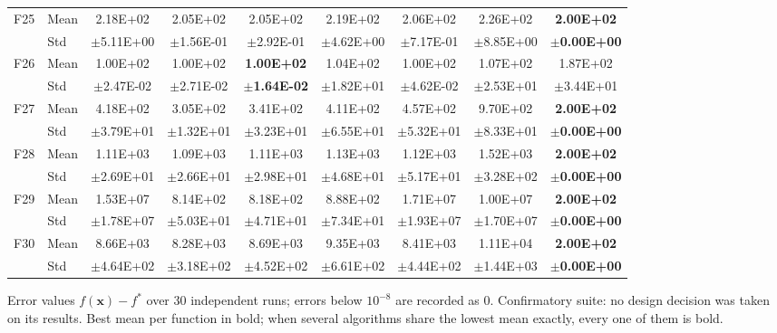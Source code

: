 \begin{table}[htbp]
{\begin{tabular}{clccccccc}
F25 & Mean & 2.18E+02 & 2.05E+02 & 2.05E+02 & 2.19E+02 & 2.06E+02 & 2.26E+02 & \textbf{2.00E+02} \\
 & Std & $\pm$5.11E+00 & $\pm$1.56E-01 & $\pm$2.92E-01 & $\pm$4.62E+00 & $\pm$7.17E-01 & $\pm$8.85E+00 & $\pm$\textbf{0.00E+00} \\
F26 & Mean & 1.00E+02 & 1.00E+02 & \textbf{1.00E+02} & 1.04E+02 & 1.00E+02 & 1.07E+02 & 1.87E+02 \\
 & Std & $\pm$2.47E-02 & $\pm$2.71E-02 & $\pm$\textbf{1.64E-02} & $\pm$1.82E+01 & $\pm$4.62E-02 & $\pm$2.53E+01 & $\pm$3.44E+01 \\
F27 & Mean & 4.18E+02 & 3.05E+02 & 3.41E+02 & 4.11E+02 & 4.57E+02 & 9.70E+02 & \textbf{2.00E+02} \\
 & Std & $\pm$3.79E+01 & $\pm$1.32E+01 & $\pm$3.23E+01 & $\pm$6.55E+01 & $\pm$5.32E+01 & $\pm$8.33E+01 & $\pm$\textbf{0.00E+00} \\
F28 & Mean & 1.11E+03 & 1.09E+03 & 1.11E+03 & 1.13E+03 & 1.12E+03 & 1.52E+03 & \textbf{2.00E+02} \\
 & Std & $\pm$2.69E+01 & $\pm$2.66E+01 & $\pm$2.98E+01 & $\pm$4.68E+01 & $\pm$5.17E+01 & $\pm$3.28E+02 & $\pm$\textbf{0.00E+00} \\
F29 & Mean & 1.53E+07 & 8.14E+02 & 8.18E+02 & 8.88E+02 & 1.71E+07 & 1.00E+07 & \textbf{2.00E+02} \\
 & Std & $\pm$1.78E+07 & $\pm$5.03E+01 & $\pm$4.71E+01 & $\pm$7.34E+01 & $\pm$1.93E+07 & $\pm$1.70E+07 & $\pm$\textbf{0.00E+00} \\
F30 & Mean & 8.66E+03 & 8.28E+03 & 8.69E+03 & 9.35E+03 & 8.41E+03 & 1.11E+04 & \textbf{2.00E+02} \\
 & Std & $\pm$4.64E+02 & $\pm$3.18E+02 & $\pm$4.52E+02 & $\pm$6.61E+02 & $\pm$4.44E+02 & $\pm$1.44E+03 & $\pm$\textbf{0.00E+00} \\
\bottomrule
\end{tabular}}
\begin{flushleft}\footnotesize
Error values $f(\mathbf{x})-f^{*}$ over 30 independent runs; errors below $10^{-8}$ are recorded as 0. Confirmatory suite: no design decision was taken on its results. Best mean per function in bold; when several algorithms share the lowest mean exactly, every one of them is bold.
\end{flushleft}
\end{table}

